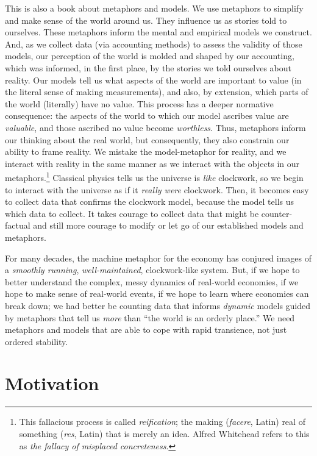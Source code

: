 % 
% 
This is also a book about metaphors and models.
We use metaphors to simplify and make sense of the world around us.
They influence us as stories told to ourselves.
These metaphors inform the mental and empirical models we construct.
And, as we collect data (via accounting methods) 
to assess the validity of those models,
our perception of the world is molded and shaped
by our accounting, which was informed, in the first place,
by the stories we told ourselves about reality.
Our models tell us what aspects of the world
are important to value 
(in the literal sense of making measurements),
 and also, by extension, 
 which parts of the world (literally) have no value.
This process has a deeper normative
consequence: the aspects of the world to which our model ascribes
value are \emph{valuable},
and those ascribed no value become \emph{worthless}.
Thus, metaphors inform our thinking about the real world,
but consequently,
they also constrain our ability to frame reality.
We mistake the model-metaphor for reality, and
we interact with reality in the same manner 
as we interact with the objects in our
metaphors.\footnote{This fallacious process is called
	\emph{reification}; the making (\emph{facere}, Latin) real of
	something (\emph{res}, Latin) that is merely an idea.
	Alfred Whitehead refers to this as
	\emph{the fallacy of misplaced concreteness}.\cite{Whitehead2011}}
Classical physics tells us the universe is
\emph{like} clockwork, 
so we begin to interact with the universe
as if it \emph{really were} clockwork.
Then, it becomes easy to collect data that confirms the clockwork model,
because the model tells us which data to collect.
It takes courage to collect data that might be counter-factual
and still more courage to modify 
or let go of our established models and metaphors.

For many decades, the machine metaphor for the economy
has conjured images of a \emph{smoothly running}, 
\emph{well-maintained}, clockwork-like system.
But, if we hope to better understand the complex, 
messy dynamics of real-world economies,
if we hope to make sense of real-world events,
if we hope to learn where economies can break down;
we had better be counting data that informs \emph{dynamic} models
guided by metaphors that tell us \emph{more} than ``the world is an orderly place.''
We need metaphors and models that are
able to cope with rapid transience,
not just ordered stability.


\section{Motivation}
\label{sec:motivation}

